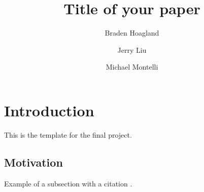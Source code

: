 \documentclass[conference]{IEEEtran}
\begin{document}
\title{Title of your paper}
\author{Braden Hoagland \and Jerry Liu \and Michael Montelli}
\maketitle

\begin{abstract}
	\lipsum[1]
\end{abstract}

\section{Introduction}

This is the template for the final project.

\subsection{Motivation}

Example of a subsection with a citation \cite{examplecitation}.



\end{document}
